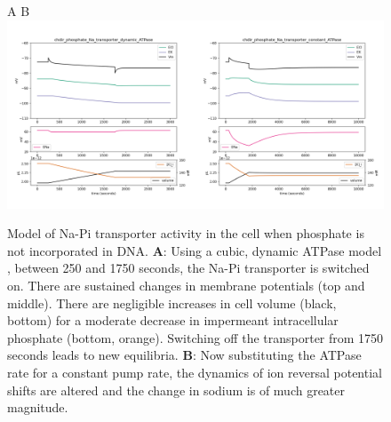 \documentclass[11pt]{article}[]
\begin{document}
\begin{figure}[h]
\centering A  \hskip 80mm B \\
\includegraphics[width=0.5\textwidth]{images/chdir_phosphate_Na_transporter_dynamic_ATPase.png}\includegraphics[width=0.5\textwidth]{images/chdir_phosphate_Na_transporter_constant_ATPase.png}
\caption{Model of Na-Pi transporter activity in the cell when phosphate is not incorporated in DNA. \textbf{A}: Using a cubic, dynamic ATPase model \cite{Dusterwald2018}, between 250 and 1750 seconds, the Na-Pi transporter is switched on. There are sustained changes in membrane potentials (top and middle). There are negligible increases in cell volume (black, bottom) for a moderate decrease in impermeant intracellular phosphate (bottom, orange). Switching off the transporter from 1750 seconds leads to new equilibria. \textbf{B}: Now substituting the ATPase rate for a constant pump rate, the dynamics of ion reversal potential shifts are altered and the change in sodium is of much greater magnitude. \label{f1}}
\end{figure}
\end{document}
